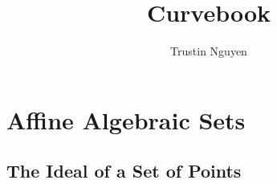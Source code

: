 \documentclass{report}
\title{Curvebook}
\author{Trustin Nguyen}
\begin{document}

\begin{titlepage}
    \maketitle
\end{titlepage}
\tableofcontents
\restoregeometry

\reversemarginpar

\chapter{Affine Algebraic Sets}

\begin{topic}
    \section{The Ideal of a Set of Points}
\end{topic}
\end{document}

